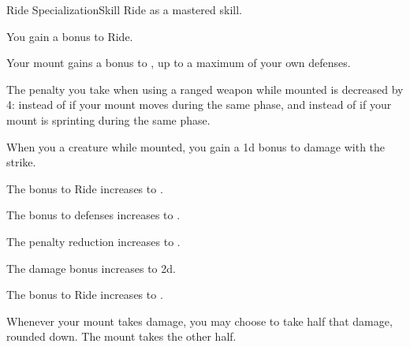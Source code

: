     \begin{feat}{Ride Specialization}{Skill}
        \featpre Ride as a mastered skill.
        \featben

         You gain a  bonus to Ride.

         Your mount gains a  bonus to , up to a maximum of your own defenses.

         The penalty you take when using a ranged weapon while mounted is decreased by 4:  instead of  if your mount moves during the same phase, and  instead of  if your mount is sprinting during the same phase.

         When you  a creature while mounted, you gain a \plus1d bonus to damage with the strike.

         The bonus to Ride increases to .

         The bonus to defenses increases to .

         The penalty reduction increases to .

         The damage bonus increases to \plus2d.

         The bonus to Ride increases to .

         Whenever your mount takes  damage, you may choose to take half that damage, rounded down.
        The mount takes the other half.
    \end{feat}

